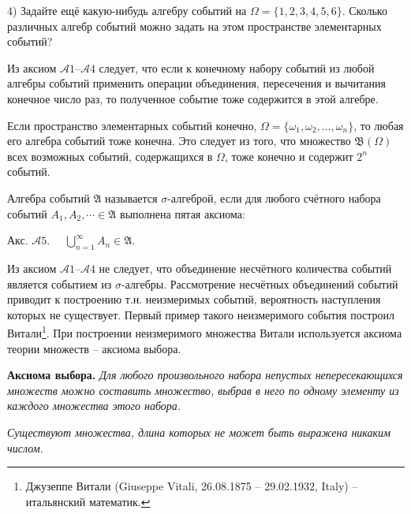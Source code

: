 4) Задайте ещё какую-нибудь алгебру событий на $\Omega = \{1, 2, 3, 4, 5, 6\}$.
Сколько различных алгебр событий можно задать на этом пространстве элементарных событий?

\begin{zam}
Из аксиом $\mathcal{A}1$--$\mathcal{A}4$ следует, что если к конечному набору событий из любой алгебры событий применить операции объединения, пересечения и вычитания конечное число раз, то полученное событие тоже содержится в этой алгебре.
\end{zam}

\begin{zam}
Если пространство элементарных событий конечно, $\Omega = \{\omega_1,\omega_2,\ldots,\omega_n\}$, то любая его алгебра событий тоже конечна. 
Это следует из того, что множество $\mathfrak{B}(\Omega)$ всех возможных событий, содержащихся в $\Omega$, тоже конечно и содержит $2^n$ событий.
\end{zam}

\begin{definition}
Алгебра событий $\mathfrak{A}$ называется $\sigma$-алгеброй, если для любого счётного набора событий $A_1,A_2,\cdots \in \mathfrak{A}$ выполнена пятая аксиома:

Акс. $\mathcal{A}5$.$\quad$ $\bigcup\limits_{n=1}^\infty A_n \in\mathfrak{A}$.
\end{definition}


\begin{zam}
Из аксиом $\mathcal{A}1$--$\mathcal{A}4$ не следует, что объединение несчётного количества событий является событием из $\sigma$-алгебры. 
Рассмотрение несчётных объединений событий приводит к построению т.н. неизмеримых событий, вероятность наступления которых не существует. 
Первый пример такого неизмеримого события построил Витали\footnote{Джузеппе Витали (Giuseppe Vitali, 26.08.1875 -- 29.02.1932, Italy) -- итальянский математик.}. 
При построении неизмеримого множества Витали используется аксиома теории множеств -- аксиома выбора.
\end{zam}

\textbf{Аксиома выбора.} \textit{Для любого произвольного набора непустых непересекающихся множеств можно составить множество, выбрав в него по одному элементу из каждого множества этого набора.}

\begin{theorem}
\textit{Существуют множества, длина которых не может быть выражена никаким числом.}
\end{theorem}


